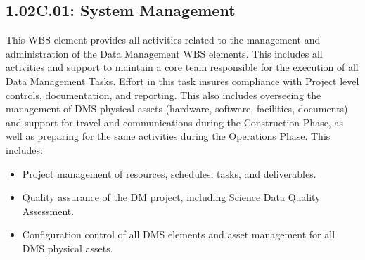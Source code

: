 \subsection*{1.02C.01: System Management}

This WBS element provides all activities related to the management and
administration of the Data Management WBS elements. This includes all activities
and support to maintain a core team responsible for the execution of all Data
Management Tasks. Effort in this task insures compliance with Project level
controls, documentation, and reporting. This also includes overseeing the
management of DMS physical assets (hardware, software, facilities, documents)
and support for travel and communications during the Construction Phase, as
well as preparing for the same activities during the Operations Phase. This
includes:

\begin{itemize}

  \item{Project management of resources, schedules, tasks, and deliverables.}

  \item{Quality assurance of the DM project, including Science Data Quality
  Assessment.}

  \item{Configuration control of all DMS elements and asset management for all
  DMS physical assets.}

\end{itemize}
